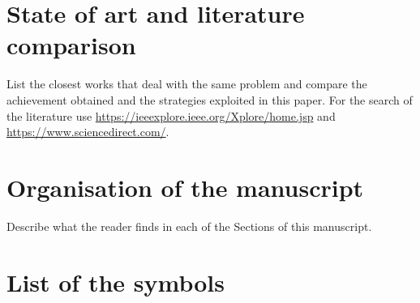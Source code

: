 \documentclass[]{report}
\begin{document}
	\section{State of art and literature comparison}
	List the closest works that deal with the same problem and compare the achievement obtained and the strategies exploited in this paper. For the search of the literature use \url{https://ieeexplore.ieee.org/Xplore/home.jsp} and \url{https://www.sciencedirect.com/}.
	
	\section{Organisation of the manuscript}
	Describe what the reader finds in each of the Sections of this manuscript.
	
	\section{List of the symbols}
\end{document}
